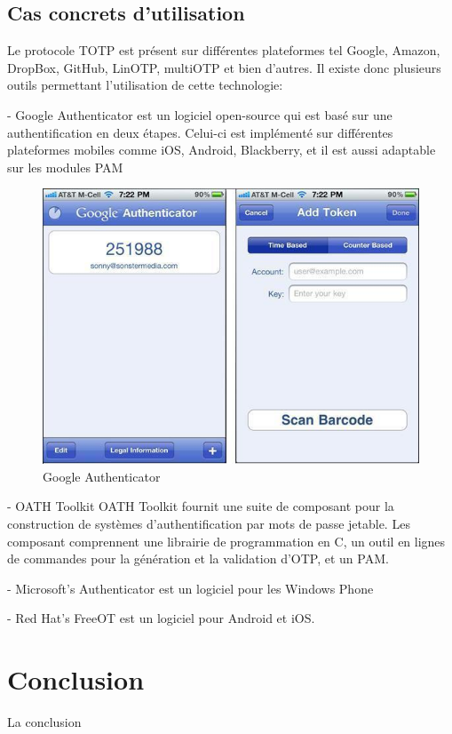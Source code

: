 \documentclass{../res/univ-projet}
\begin{document}
  \subsection{Cas concrets d'utilisation}
   Le protocole TOTP est présent sur différentes plateformes tel Google, Amazon, DropBox, GitHub, LinOTP, multiOTP et bien d'autres.
   Il existe donc plusieurs outils permettant l'utilisation de cette technologie:
   \begin{description}
    \item - Google Authenticator est un logiciel open-source qui est basé sur une authentification en deux étapes. Celui-ci est implémenté sur différentes plateformes 
	  mobiles comme iOS, Android, Blackberry, et il est aussi adaptable sur les modules PAM
	  \begin{figure}[h!]
	    \centerline{\includegraphics[scale=0.45]{imgHOTP/GoogleAuthenticator_2.jpg}}
	    \caption{Google Authenticator}
	  \end{figure}  
    \item - OATH Toolkit OATH Toolkit fournit une suite de composant pour la construction de systèmes d'authentification par mots de passe jetable. 
	  Les composant comprennent une librairie de programmation en C, un outil en lignes de commandes pour la génération et la validation d'OTP, et un PAM.
    \item - Microsoft's Authenticator est un logiciel pour les Windows Phone
    \item - Red Hat's FreeOT est un logiciel pour Android et iOS.
   \end{description}
  
\section{Conclusion}
La conclusion
\end{document}
